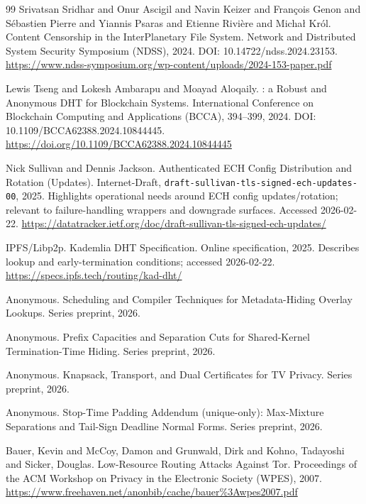 \documentclass[11pt]{article}
\begin{document}
\begin{thebibliography}{99}
Srivatsan Sridhar and Onur Ascigil and Navin Keizer and Fran\c{c}ois Genon and S\'ebastien Pierre and Yiannis Psaras and Etienne Rivi\`ere and Micha\l{} Kr\'ol.
\newblock Content Censorship in the {InterPlanetary} File System.
\newblock Network and Distributed System Security Symposium (NDSS), 2024.
\newblock DOI: 10.14722/ndss.2024.23153.
\newblock \url{https://www.ndss-symposium.org/wp-content/uploads/2024-153-paper.pdf}

Lewis Tseng and Lokesh Ambarapu and Moayad Aloqaily.
: a Robust and Anonymous {DHT} for Blockchain Systems.
\newblock International Conference on Blockchain Computing and Applications (BCCA), 394--399, 2024.
\newblock DOI: 10.1109/BCCA62388.2024.10844445.
\newblock \url{https://doi.org/10.1109/BCCA62388.2024.10844445}

Nick Sullivan and Dennis Jackson.
\newblock Authenticated {ECH} Config Distribution and Rotation (Updates).
\newblock Internet-Draft, \texttt{draft-sullivan-tls-signed-ech-updates-00}, 2025.
\newblock Highlights operational needs around ECH config updates/rotation; relevant to failure-handling wrappers and downgrade surfaces. Accessed 2026-02-22.
\newblock \url{https://datatracker.ietf.org/doc/draft-sullivan-tls-signed-ech-updates/}

{IPFS/Libp2p}.
 Kademlia {DHT} Specification.
\newblock Online specification, 2025.
\newblock Describes lookup and early-termination conditions; accessed 2026-02-22.
\newblock \url{https://specs.ipfs.tech/routing/kad-dht/}

{Anonymous}.
\newblock Scheduling and Compiler Techniques for Metadata-Hiding Overlay Lookups.
\newblock Series preprint, 2026.

{Anonymous}.
\newblock Prefix Capacities and Separation Cuts for Shared-Kernel Termination-Time Hiding.
\newblock Series preprint, 2026.

{Anonymous}.
\newblock Knapsack, Transport, and Dual Certificates for {TV} Privacy.
\newblock Series preprint, 2026.

{Anonymous}.
\newblock Stop-Time Padding Addendum (unique-only): Max-Mixture Separations and Tail-Sign Deadline Normal Forms.
\newblock Series preprint, 2026.

Bauer, Kevin and McCoy, Damon and Grunwald, Dirk and Kohno, Tadayoshi and Sicker, Douglas.
\newblock Low-Resource Routing Attacks Against Tor.
\newblock Proceedings of the ACM Workshop on Privacy in the Electronic Society (WPES), 2007.
\newblock \url{https://www.freehaven.net/anonbib/cache/bauer%3Awpes2007.pdf}


\end{thebibliography}
\end{document}
